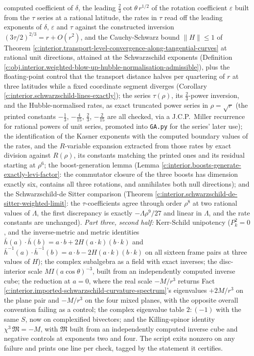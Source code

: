 \documentclass[11pt]{article}
\theoremstyle{definition}
\theoremstyle{plain}
\providecommand{\hb}{}\renewcommand{\hb}{\bar{h}}
\begin{document}
computed coefficient of $\delta$, the leading $\tfrac23\cot\theta\, r^{1/2}$ of the rotation coefficient $\varepsilon$ built from the $\tau$ series at a rational latitude, the rates in $\tau$ read off the leading exponents of $\delta$, $\varepsilon$ and $\tau$ against the constructed inversion $(3\tau/2)^{2/3} = r + O(r^2)$, and the Cauchy-Schwarz bound $\|H\| \le 1$ of Theorem \ref{c:interior.transport-level-convergence-along-tangential-curves} at rational unit directions, attained at the Schwarzschild exponents (Definition \ref{c:obj.interior.weighted-blow-up-hubble-normalisation-admissible}), plus the floating-point control that the transport distance halves per quartering of $r$ at three latitudes while a fixed coordinate segment diverges (Corollary \ref{c:interior.schwarzschild-lines-exactly}); the series $\tau(\rho)$, its $\tfrac23$-power inversion, and the Hubble-normalised rates, as exact truncated power series in $\rho = \sqrt r$ (the printed constants $-\tfrac13$, $-\tfrac{4}{15}$, $\tfrac23$, $-\tfrac{2}{15}$ are all checked, via a J.C.P.\ Miller recurrence for rational powers of unit series, promoted into \texttt{GA.py} for the series' later use); the identification of the Kasner exponents with the computed boundary values of the rates, and the $R$-variable expansion extracted from those rates by exact division against $R(\rho)$, its constants matching the printed ones and its residual starting at $\rho^6$; the boost-generation lemma (Lemma \ref{c:interior.boosts-generate-exactly-levi-factor}: the commutator closure of the three boosts has dimension exactly six, contains all three rotations, and annihilates both null directions); and the Schwarzschild-de Sitter comparison (Theorem \ref{c:interior.schwarzschild-de-sitter-weighted-limit}: the $\tau$-coefficients agree through order $\rho^8$ at two rational values of $\Lambda$, the first discrepancy is exactly $-\Lambda\rho^9/27$ and linear in $\Lambda$, and the rate constants are unchanged). \emph{Part three, second half:} Kerr-Schild unipotency ($P_k^2 = 0$, and the inverse-metric and metric identities $\hb(a)\cdot\hb(b) = a\cdot b + 2H(a\cdot k)(b\cdot k)$ and $\hb^{-1}(a)\cdot\hb^{-1}(b) = a\cdot b - 2H(a\cdot k)(b\cdot k)$ on all sixteen frame pairs at three values of $H$); the complex subalgebra as a field with exact inverses; the disc-interior scale $M I (a\cos\theta)^{-3}$, built from an independently computed inverse cube; the reduction at $a = 0$, where the real scale $-M/r^3$ returns Fact \ref{c:interior.imported-schwarzschild-curvature-spectrum}'s eigenvalues $+2M/r^3$ on the plane pair and $-M/r^3$ on the four mixed planes, with the opposite overall convention failing as a control; the complex eigenvalue table $2 : (-1)$ with the same $S$, now on complexified bivectors; and the Killing-spinor identity $\chi^3\,\mathfrak M = -M$, with $\mathfrak M$ built from an independently computed inverse cube and negative controls at exponents two and four. The script exits nonzero on any failure and prints one line per check, tagged by the statement it certifies.
\end{document}
